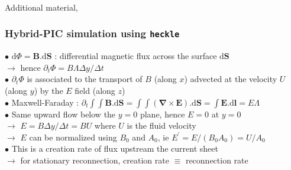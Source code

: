 \documentclass{beamer}
\newcommand{\D}{{\mathrm d}}
\begin{document}
\begin{frame}
\frametitle{}

{ {\LARGE Additional material,}}

\end{frame}



\begin{frame}
\frametitle{Hybrid-PIC simulation using \texttt{heckle}}

\begin{center}

\end{center}


$\bullet$ $\D \Phi = \mathbf B . \D \mathbf S$ : differential magnetic flux across the surface $\D \mathbf S$ \\
$\to$ hence $\partial_t \Phi = B \Lambda \Delta y / \Delta t$ \\
$\bullet$ $\partial_t \Phi$ is associated to the transport of $B$ (along $x$) advected at the velocity $U$ (along $y$) by the $E$ field (along $z$) \\
$\bullet$ Maxwell-Faraday : $\partial_t \int \!\!\! \int \mathbf B . \D \mathbf S = \int \!\!\! \int (\boldsymbol{\nabla} \times \mathbf E) . \D \mathbf S =  \int \mathbf E . \D \mathbf l = E \Lambda$ \\
$\bullet$ Same upward flow below the $y=0$ plane, hence $E = 0$ at $y = 0$ \\
$\to$ $E = B \Delta y / \Delta t = B U$ where $U$ is the fluid velocity \\
$\to$ $E$ can be normalized using $B_0$ and $A_0$, ie $E^{\prime} = E/(B_0 A_0) = U / A_0$ \\
$\bullet$ This is a creation rate of flux upstream the current sheet \\
$\to$ for stationary reconnection, creation rate $\equiv$ reconnection rate \\



\end{frame}
\end{document}
